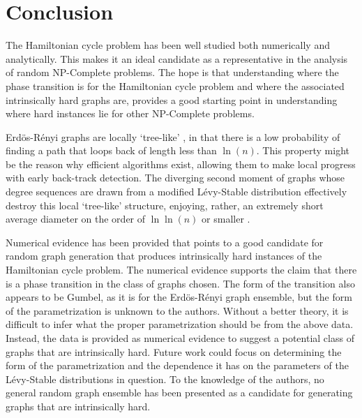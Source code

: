 \documentclass[twoside,11pt]{article}
\begin{document}
\section{Conclusion}

The Hamiltonian cycle problem has been well studied both numerically and analytically.  This
makes it an ideal candidate as a representative in the analysis of random NP-Complete problems.
The hope is that understanding where the phase transition is for the Hamiltonian cycle
problem and where the associated intrinsically hard graphs are, provides a good starting point
in understanding where hard instances lie for other NP-Complete problems.


Erd\"os-R\'enyi graphs are locally `tree-like' \cite{mezard}, in that there is a low probability of finding a path that loops back of length
less than $\ln(n)$.  This property might be the reason why efficient algorithms exist, allowing them to make local progress with
early back-track detection.
The diverging second moment of graphs whose
degree sequences are drawn from a modified L\'evy-Stable distribution
effectively destroy this local `tree-like' structure, enjoying, rather, an extremely short average diameter on the
order of $\ln \ln(n)$ or smaller
\cite{esker_hofstad_hooghiemstra_znamenski,hofstad_hooghiemstra_mieghem,hofstad_hooghiemstra_znamensi}.


Numerical evidence has been provided that points to a good candidate for random graph generation that produces intrinsically
hard instances of the Hamiltonian cycle problem.
The numerical evidence supports the claim that there is a phase transition in the class of graphs chosen.  The form of the
transition also appears to be Gumbel, as it is for the Erd\"os-R\'enyi graph ensemble,
but the form of the parametrization is unknown to the authors.  Without a better theory, it is difficult to infer what
the proper parametrization should be from the above data.  Instead, the data is provided as numerical evidence
to suggest a potential class of graphs that are intrinsically hard.  Future work could 
focus on 
determining the form
of the parametrization and the dependence it has on the parameters of the L\'evy-Stable distributions in question.
To the knowledge of the authors, 
no general random graph ensemble has been presented as a candidate for generating graphs that are intrinsically hard.
\end{document}
